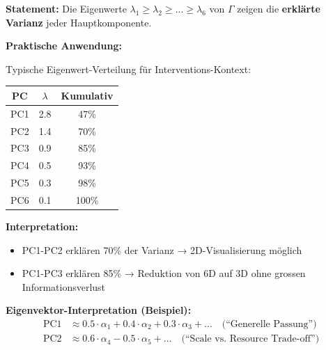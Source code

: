 \begin{tcolorbox}[colback=green!5!white, colframe=green!75!black,
    title=\textbf{Theorem HHH-T11: Eigenwert-Dekomposition für Dimensions-Reduktion}]

\textbf{Statement:} Die Eigenwerte $\lambda_1 \geq \lambda_2 \geq ... \geq \lambda_6$ von $\Gamma$ zeigen die \textbf{erklärte Varianz} jeder Hauptkomponente.

\textbf{Praktische Anwendung:}

Typische Eigenwert-Verteilung für Interventions-Kontext:
\begin{center}
\begin{tabular}{@{}ccc@{}}
\toprule
\textbf{PC} & $\lambda$ & \textbf{Kumulativ} \\
\midrule
PC1 & 2.8 & 47\% \\
PC2 & 1.4 & 70\% \\
PC3 & 0.9 & 85\% \\
PC4 & 0.5 & 93\% \\
PC5 & 0.3 & 98\% \\
PC6 & 0.1 & 100\% \\
\bottomrule
\end{tabular}
\end{center}

\textbf{Interpretation:}
\begin{itemize}[nosep]
    \item PC1-PC2 erklären 70\% der Varianz → 2D-Visualisierung möglich
    \item PC1-PC3 erklären 85\% → Reduktion von 6D auf 3D ohne grossen Informationsverlust
\end{itemize}

\textbf{Eigenvektor-Interpretation (Beispiel):}
\begin{align*}
\text{PC1} &\approx 0.5 \cdot \alpha_1 + 0.4 \cdot \alpha_2 + 0.3 \cdot \alpha_3 + ... \quad \text{(``Generelle Passung'')} \\
\text{PC2} &\approx 0.6 \cdot \alpha_4 - 0.5 \cdot \alpha_5 + ... \quad \text{(``Scale vs. Resource Trade-off'')}
\end{align*}

\end{tcolorbox}

